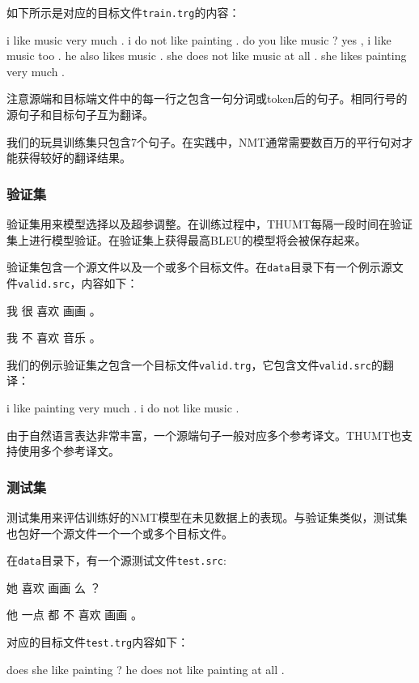 \documentclass{article}
\begin{document}
如下所示是对应的目标文件\verb|train.trg|的内容：
\begin{everbatim}
i like music very much .
i do not like painting .
do you like music ?
yes , i like music too .
he also likes music .
she does not like music at all .
she likes painting very much .
\end{everbatim}

注意源端和目标端文件中的每一行之包含一句分词或token后的句子。相同行号的源句子和目标句子互为翻译。

我们的玩具训练集只包含7个句子。在实践中，NMT通常需要数百万的平行句对才能获得较好的翻译结果。

\subsubsection{验证集}

验证集用来模型选择以及超参调整。在训练过程中，THUMT每隔一段时间在验证集上进行模型验证。在验证集上获得最高BLEU的模型将会被保存起来。

验证集包含一个源文件以及一个或多个目标文件。在\verb|data|目录下有一个例示源文件\verb|valid.src|，内容如下：

\begin{everbatim}
我 很 喜欢 画画 。

我 不 喜欢 音乐 。

\end{everbatim}

我们的例示验证集之包含一个目标文件\verb|valid.trg|，它包含文件\verb|valid.src|的翻译：
\begin{everbatim}
i like painting very much .
i do not like music .
\end{everbatim}

由于自然语言表达非常丰富，一个源端句子一般对应多个参考译文。THUMT也支持使用多个参考译文。

\subsubsection{测试集}
测试集用来评估训练好的NMT模型在未见数据上的表现。与验证集类似，测试集也包好一个源文件一个一个或多个目标文件。

在\verb|data|目录下，有一个源测试文件\verb|test.src|:
\begin{everbatim}
她 喜欢 画画 么 ？

他 一点 都 不 喜欢 画画 。

\end{everbatim}

对应的目标文件\verb|test.trg|内容如下：
\begin{everbatim}
does she like painting ?
he does not like painting at all .
\end{everbatim}
\end{document}
